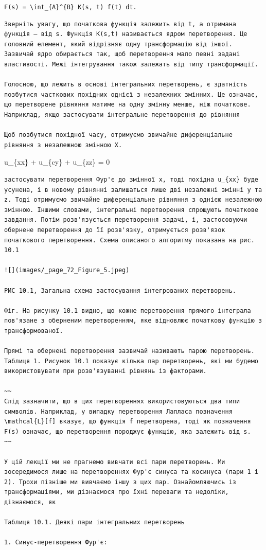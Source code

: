 \documentclass[
  ukrainian,
]{article}
\begin{document}
\texttt{F(s)\ =\ \textbackslash{}int\_\{A\}\^{}\{B\}\ K(s,\ t)\ f(t)\ dt.}

\begin{verbatim}
Зверніть увагу, що початкова функція залежить від t, а отримана функція — від s. Функція K(s,t) називається ядром перетворення. Це головний елемент, який відрізняє одну трансформацію від іншої. Зазвичай ядро обирається так, щоб перетворення мало певні задані властивості. Межі інтегрування також залежать від типу трансформації.

Голосною, що лежить в основі інтегральних перетворень, є здатність позбутися часткових похідних однієї з незалежних змінних. Це означає, що перетворене рівняння матиме на одну змінну менше, ніж початкове. Наприклад, якщо застосувати інтегральне перетворення до рівняння

Щоб позбутися похідної часу, отримуємо звичайне диференціальне рівняння з незалежною змінною X.
\end{verbatim}

u\_\{xx\} + u\_\{cy\} + u\_\{zz\} = 0

\begin{verbatim}
застосувати перетворення Фур'є до змінної x, тоді похідна u_{xx} буде усунена, і в новому рівнянні залишаться лише дві незалежні змінні y та z. Тоді отримуємо звичайне диференціальне рівняння з однією незалежною змінною. Іншими словами, інтегральні перетворення спрощують початкове завдання. Потім розв'язується перетворення задачі, і, застосовуючи обернене перетворення до її розв'язку, отримується розв'язок початкового перетворення. Схема описаного алгоритму показана на рис. 10.1

![](images/_page_72_Figure_5.jpeg)

РИС 10.1, Загальна схема застосування інтегрованих перетворень.

Фіг. На рисунку 10.1 видно, що кожне перетворення прямого інтеграла пов'язане з оберненим перетворенням, яке відновлює початкову функцію з трансформованої.

Прямі та обернені перетворення зазвичай називають парою перетворень. Таблиця 1. Рисунок 10.1 показує кілька пар перетворень, які ми будемо використовувати при розв'язуванні рівнянь із факторами.

~~
Слід зазначити, що в цих перетвореннях використовуються два типи символів. Наприклад, у випадку перетворення Лапласа позначення \mathcal{L}[f] вказує, що функція f перетворена, тоді як позначення F(s) означає, що перетворення породжує функцію, яка залежить від s.
~~

У цій лекції ми не прагнемо вивчати всі пари перетворень. Ми зосередимося лише на перетвореннях Фур'є синуса та косинуса (пари 1 і 2). Трохи пізніше ми вивчаємо іншу з цих пар. Ознайомляючись із трансформаціями, ми дізнаємося про їхні переваги та недоліки, дізнаємося, як

Таблиця 10.1. Деякі пари інтегральних перетворень

1. Синус-перетворення Фур'є:
\end{verbatim}
\end{document}
